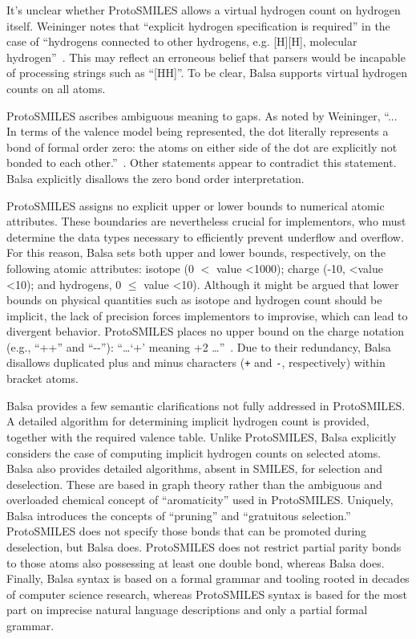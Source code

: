 \documentclass{article}
\def\ttt{\texttt}
\begin{document}
It's unclear whether ProtoSMILES allows a virtual hydrogen count on hydrogen itself. Weininger notes that \enquote{explicit hydrogen specification is required} in the case of \enquote{hydrogens connected to other hydrogens, e.g. [H][H], molecular hydrogen}~\cite[p.~97]{weininger:2003}. This may reflect an erroneous belief that parsers would be incapable of processing strings such as \enquote{[HH]}. To be clear, Balsa supports virtual hydrogen counts on all atoms.

ProtoSMILES ascribes ambiguous meaning to gaps. As noted by Weininger, \enquote{... In terms of the valence model being represented, the dot literally represents a bond of formal order zero: the atoms on either side of the dot are explicitly not bonded to each other.}~\cite[p.~88]{weininger:2003}. Other statements appear to contradict this statement. Balsa explicitly disallows the zero bond order interpretation.

ProtoSMILES assigns no explicit upper or lower bounds to numerical atomic attributes. These boundaries are nevertheless crucial for implementors, who must determine the data types necessary to efficiently prevent underflow and overflow. For this reason, Balsa sets both upper and lower bounds, respectively, on the following atomic attributes: isotope (0 $<$ value \textless 1000); charge (-10, \textless value \textless 10); and hydrogens, 0 $\leq$ value \textless 10). Although it might be argued that lower bounds on physical quantities such as isotope and hydrogen count should be implicit, the lack of precision forces implementors to improvise, which can lead to divergent behavior. ProtoSMILES places no upper bound on the charge notation (e.g., \enquote{++} and \enquote{-{}-}): \enquote{\dots \enquote{+} meaning +2 \dots}~\cite[p.~94]{weininger:2003}. Due to their redundancy, Balsa disallows duplicated plus and minus characters (\ttt{+} and \ttt{-}, respectively) within bracket atoms.

Balsa provides a few semantic clarifications not fully addressed in ProtoSMILES. A detailed algorithm for determining implicit hydrogen count is provided, together with the required valence table. Unlike ProtoSMILES, Balsa explicitly considers the case of computing implicit hydrogen counts on selected atoms. Balsa also provides detailed algorithms, absent in SMILES, for selection and deselection. These are based in graph theory rather than the ambiguous and overloaded chemical concept of \enquote{aromaticity} used in ProtoSMILES. Uniquely, Balsa introduces the concepts of \enquote{pruning} and \enquote{gratuitous selection.} ProtoSMILES does not specify those bonds that can be promoted during deselection, but Balsa does. ProtoSMILES does not restrict partial parity bonds to those atoms also possessing at least one double bond, whereas Balsa does. Finally, Balsa syntax is based on a formal grammar and tooling rooted in decades of computer science research, whereas ProtoSMILES syntax is based for the most part on imprecise natural language descriptions and only a partial formal grammar.
\end{document}
